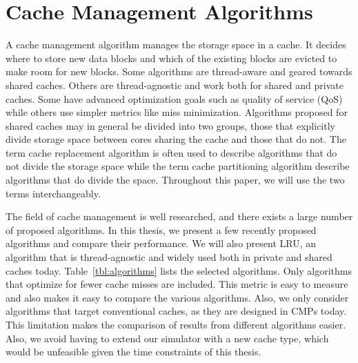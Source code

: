
\chapter{Cache Management Algorithms}
\label{cpt:algorithms}


A cache management algorithm manages the storage space in a cache.
It decides where to store new data blocks and which of the existing blocks are evicted to make room for new blocks.
Some algorithms are thread-aware and geared towards shared caches.
Others are thread-agnostic and work both for shared and private caches.
Some have advanced optimization goals such as quality of service (QoS) while others use simpler metrics like miss minimization.
Algorithms proposed for shared caches may in general be divided into two groups, those that explicitly divide storage space between cores sharing the cache and those that do not.
The term cache replacement algorithm is often used to describe algorithms that do not divide the storage space while the term cache partitioning algorithm describe algorithms that do divide the space.
Throughout this paper, we will use the two terms interchangeably.

The field of cache management is well researched, and there exists a large number of proposed algorithms.
In this thesis, we present a few recently proposed algorithms and compare their performance.
We will also present LRU, an algorithm that is thread-agnostic and widely used both in private and shared caches today.
Table~\ref{tbl:algorithms} lists the selected algorithms.
Only algorithms that optimize for fewer cache misses are included.
This metric is easy to measure and also makes it easy to compare the various algorithms.
Also, we only consider algorithms that target conventional caches, as they are designed in CMPs today.
This limitation makes the comparison of results from different algorithms easier.
Also, we avoid having to extend our simulator with a new cache type, which would be unfeasible given the time constraints of this thesis.

